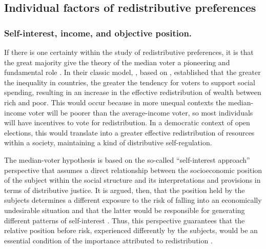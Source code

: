 \documentclass[utf8]{frontiersSCNS} %
\begin{document}
\subsection{Individual factors of redistributive preferences}

\subsubsection{Self-interest, income, and objective position.}

If there is one certainty within the study of redistributive preferences, it is that the great majority give the theory of the median voter a pioneering and fundamental role \parencite{AlesinaPreferencesRedistribution2009, BerensPreferencesRedistributionFragmented2015, CastilloRedistributiveConflictsPreferences2010, CastilloInequalityDistributiveJustice2015, DhamiRedistributivepoliciesheterogeneous2010, DhamiRedistributivepoliciesheterogeneous2010, KellerAnalysinglinkmeasured2010, LubkerGlobalizationperceptionssocial2004, McCallUndeservingRichAmerican2013}. In their classic model, \textcite{MeltzerRationalTheorySize1981}, based on \textcite {RomerIndividualwelfaremajority1975}, established that the greater the inequality in countries, the greater the tendency for voters to support social spending, resulting in an increase in the effective redistribution of wealth between rich and poor. This would occur because in more unequal contexts the median-income voter will be poorer than the average-income voter, so most individuals will have incentives to vote for redistribution. In a democratic context of open elections, this would translate into a greater effective redistribution of resources within a society, maintaining a kind of distributive self-regulation.

The median-voter hypothesis is based on the so-called “self-interest approach” perspective that assumes a direct relationship between the socioeconomic position of the subject within the social structure and its interpretations and provisions in terms of distributive justice. It is argued, then, that the position held by the subjects determines a different exposure to the risk of falling into an economically undesirable situation and that the latter would be responsible for generating different patterns of self-interest \parencite{WegenerInnerWallHere2000}. Thus, this perspective guarantees that the relative position before risk, experienced differently by the subjects, would be an essential condition of the importance attributed to redistribution \parencite{BarthPoliticalReinforcementHow2015, RehmInsecureAlliancesRisk2012}.
\end{document}
